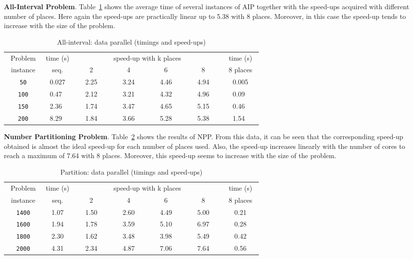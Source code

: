 \documentclass{llncs}
\newcommand{\BL}{\vspace{\baselineskip}}
\begin{document}
\BL \noindent \textbf{All-Interval
  Problem}. Table~\ref{tab:AllIntervalResult} shows the average time
of several instances of AIP together with the speed-ups acquired with
different number of places. Here again the speed-ups are practically
linear up to 5.38 with 8 places. Moreover, in this case the speed-up
tends to increase with the size of the problem.

\begin{table}[htb]
  \begin{center}
  \begin{tabular}{||c|c|c|c|c|c|c||}
    \hline
    ~Problem~ & time (s) & \multicolumn{4}{|c|}{speed-up with k places}  & time (s) \\
    \cline{3-6}
    instance  & seq.     & ~~~~2~~~~ & ~~~~4~~~~ & ~~~~6~~~~ & ~~~~8~~~~ &~8 places~\\
    \hline
    \hline
    \texttt{50}  & 0.027 & 2.25 & 3.24 & 4.46 & 4.94 & 0.005 \\
    \texttt{100} & 0.47~ & 2.12 & 3.21 & 4.32 & 4.96 & 0.09~ \\
    \texttt{150} & 2.36~ & 1.74 & 3.47 & 4.65 & 5.15 & 0.46~ \\
    \texttt{200} & 8.29~ & 1.84 & 3.66 & 5.28 & 5.38 & 1.54~ \\
\hline
  \end{tabular}
  \end{center}
  \caption{All-interval: data parallel (timings and speed-ups)}
  \label{tab:AllIntervalResult}
\end{table}

\BL \noindent \textbf{Number Partitioning
  Problem}. Table~\ref{tab:PartitResult} shows the results of NPP.
From this data, it can be seen that the corresponding speed-up
obtained is almost the ideal speed-up for each number of places used.
Also, the speed-up increases linearly with the number of cores
to reach a maximum of 7.64 with 8 places.  Moreover, this speed-up
seems to increase with the size of the problem.

\begin{table}[htb]
  \begin{center}
  \begin{tabular}{||c|c|c|c|c|c|c||}
    \hline
    ~Problem~ & time (s) & \multicolumn{4}{|c|}{speed-up with k places}  & time (s) \\
    \cline{3-6}
    instance  & seq.     & ~~~~2~~~~ & ~~~~4~~~~ & ~~~~6~~~~ & ~~~~8~~~~ &~8 places~\\
    \hline
    \hline
    \texttt{1400} & 1.07 & 1.50 & 2.60 & 4.49 & 5.00 & 0.21 \\
    \texttt{1600} & 1.94 & 1.78 & 3.59 & 5.10 & 6.97 & 0.28 \\
    \texttt{1800} & 2.30 & 1.62 & 3.48 & 3.98 & 5.49 & 0.42 \\
    \texttt{2000} & 4.31 & 2.34 & 4.87 & 7.06 & 7.64 & 0.56 \\
\hline
  \end{tabular}
  \end{center}
  \caption{Partition: data parallel (timings and speed-ups)}
  \label{tab:PartitResult}
\end{table}
\end{document}
